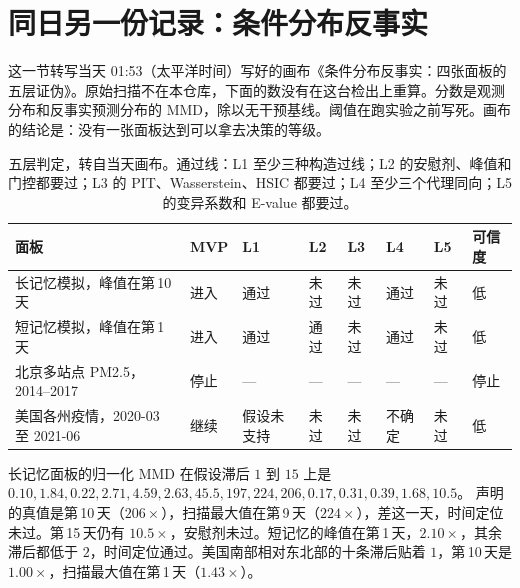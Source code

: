 \documentclass[11pt,a4paper,fontset=none]{ctexart}
\begin{document}
\FloatBarrier
\appendix

\section{同日另一份记录：条件分布反事实}
\label{app:cf}

这一节转写当天 01:53（太平洋时间）写好的画布《条件分布反事实：四张面板的五层证伪》。原始扫描不在本仓库，下面的数没有在这台检出上重算。分数是观测分布和反事实预测分布的 MMD，除以无干预基线。阈值在跑实验之前写死。画布的结论是：没有一张面板达到可以拿去决策的等级。

\begin{table}[ht]
\centering
\caption{五层判定，转自当天画布。通过线：L1 至少三种构造过线；L2 的安慰剂、峰值和门控都要过；L3 的 PIT、Wasserstein、HSIC 都要过；L4 至少三个代理同向；L5 的变异系数和 E-value 都要过。}
\label{tab:cf-layers}
\footnotesize
\begin{tabular}{@{}>{\raggedright\arraybackslash}p{3.6cm}lllllll@{}}
\toprule
面板 & MVP & L1 & L2 & L3 & L4 & L5 & 可信度 \\
\midrule
长记忆模拟，峰值在第\,10\,天 & 进入 & 通过 & 未过 & 未过 & 通过 & 未过 & 低 \\
短记忆模拟，峰值在第\,1\,天 & 进入 & 通过 & 通过 & 未过 & 通过 & 未过 & 低 \\
北京多站点 PM2.5，2014--2017 & 停止 & --- & --- & --- & --- & --- & 停止 \\
美国各州疫情，2020-03 至 2021-06 & 继续 & 假设未支持 & 未过 & 未过 & 不确定 & 未过 & 低 \\
\bottomrule
\end{tabular}
\end{table}

长记忆面板的归一化 MMD 在假设滞后 \(1\) 到 \(15\) 上是
\(0.10,\allowbreak 1.84,\allowbreak 0.22,\allowbreak 2.71,\allowbreak 4.59,\allowbreak 2.63,\allowbreak 45.5,\allowbreak 197,\allowbreak 224,\allowbreak 206,\allowbreak 0.17,\allowbreak 0.31,\allowbreak 0.39,\allowbreak 1.68,\allowbreak 10.5\)。
声明的真值是第\,10\,天（\(206\times\)），扫描最大值在第\,9\,天（\(224\times\)），差这一天，时间定位未过。第\,15\,天仍有 \(10.5\times\)，安慰剂未过。短记忆的峰值在第\,1\,天，\(2.10\times\)，其余滞后都低于 \(2\)，时间定位通过。美国南部相对东北部的十条滞后贴着 \(1\)，第\,10\,天是 \(1.00\times\)，扫描最大值在第\,1\,天（\(1.43\times\)）。
\end{document}
